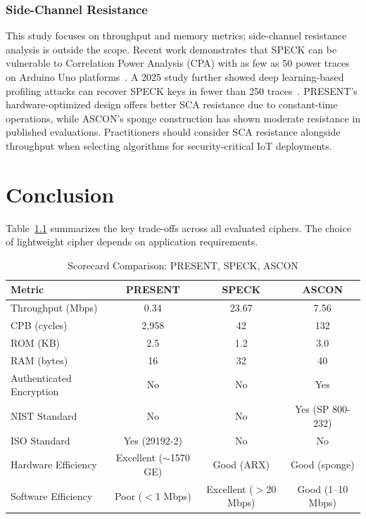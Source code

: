 \documentclass[12pt]{report}
\begin{document}
\subsection*{Side-Channel Resistance}

This study focuses on throughput and memory metrics; side-channel resistance analysis
is outside the scope. Recent work demonstrates that SPECK can be vulnerable to
Correlation Power Analysis (CPA) with as few as 50 power traces on Arduino Uno
platforms~\cite{nakanose2021speck}. A 2025 study further showed deep learning-based
profiling attacks can recover SPECK keys in fewer than 250 traces~\cite{scientificreports2025}.
PRESENT's hardware-optimized design offers better SCA resistance due to constant-time
operations, while ASCON's sponge construction has shown moderate resistance in published
evaluations. Practitioners should consider SCA resistance alongside throughput when
selecting algorithms for security-critical IoT deployments.

\chapter{Conclusion}

Table~\ref{tab:scorecard} summarizes the key trade-offs across all evaluated ciphers.
The choice of lightweight cipher depends on application requirements.

\begin{table}[H]
    \centering
    \begin{tabular}{lccc}
        \toprule
        \textbf{Metric} & \textbf{PRESENT} & \textbf{SPECK} & \textbf{ASCON} \\
        \midrule
        Throughput (Mbps) & 0.34 & 23.67 & 7.56 \\
        CPB (cycles) & 2,958 & 42 & 132 \\
        ROM (KB) & 2.5 & 1.2 & 3.0 \\
        RAM (bytes) & 16 & 32 & 40 \\
        Authenticated Encryption & No & No & Yes \\
        NIST Standard & No & No & Yes (SP 800-232) \\
        ISO Standard & Yes (29192-2) & No & No \\
        Hardware Efficiency & Excellent ($\sim$1570 GE) & Good (ARX) & Good (sponge) \\
        Software Efficiency & Poor ($<$1 Mbps) & Excellent ($>$20 Mbps) & Good (1--10 Mbps) \\
        \bottomrule
    \end{tabular}
    \caption{Scorecard Comparison: PRESENT, SPECK, ASCON}
    \label{tab:scorecard}
\end{table}
\end{document}
